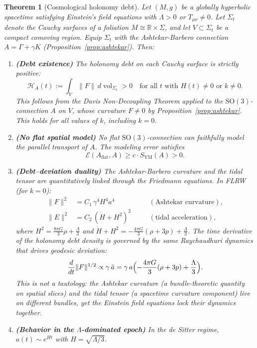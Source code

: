 \documentclass[12pt]{amsart}
\newtheorem{theorem}{Theorem}[section]
\theoremstyle{definition}
\newcommand{\R}{\mathbb{R}}
\newcommand{\vol}{\operatorname{vol}}
\newcommand{\SYM}{S_{\mathrm{YM}}}
\begin{document}
\begin{theorem}[Cosmological holonomy debt]
\label{thm:cosmo}
Let $(M, g)$ be a globally hyperbolic spacetime satisfying Einstein's field equations with $\Lambda > 0$ or $T_{\mu\nu} \neq 0$.  Let $\Sigma_t$ denote the Cauchy surfaces of a foliation $M \cong \R \times \Sigma$, and let $V \subset \Sigma_t$ be a compact comoving region.  Equip $\Sigma_t$ with the Ashtekar-Barbero connection $A = \Gamma + \gamma K$ (Proposition~\ref{prop:ashtekar}).  Then:
\begin{enumerate}[label=\textup{(\Roman*)}]
\item \textbf{(Debt existence)} The holonomy debt on each Cauchy surface is strictly positive:
\[
\mathcal{H}_A(t) := \int_V \|F\| \, d\vol_{\Sigma_t} > 0 \quad \text{for all } t \text{ with } H(t) \neq 0 \text{ or } k \neq 0.
\]
This follows from the Davis Non-Decoupling Theorem applied to the $\mathrm{SO}(3)$-connection $A$ on $V$, whose curvature $F \neq 0$ by Proposition~\ref{prop:ashtekar}.  This holds for \emph{all} values of $k$, including $k = 0$.

\item \textbf{(No flat spatial model)} No flat $\mathrm{SO}(3)$-connection can faithfully model the parallel transport of $A$.  The modeling error satisfies
\[
\mathcal{E}(A_{\mathrm{flat}}, A) \geq c \cdot \SYM(A) > 0.
\]

\item \textbf{(Debt--deviation duality)} The Ashtekar-Barbero curvature and the tidal tensor are quantitatively linked through the Friedmann equations.  In FLRW (for $k = 0$):
\begin{align*}
\|F\|^2 &= C_1\,\gamma^4 H^4 a^4 &\quad &(\text{Ashtekar curvature}), \\
\|E\|^2 &= C_2\,(\dot H + H^2)^2 &\quad &(\text{tidal acceleration}),
\end{align*}
where $H^2 = \frac{8\pi G}{3}\rho + \frac{\Lambda}{3}$ and $\dot H + H^2 = -\frac{4\pi G}{3}(\rho + 3p) + \frac{\Lambda}{3}$.  The time derivative of the holonomy debt density is governed by the same Raychaudhuri dynamics that drives geodesic deviation:
\[
\frac{d}{dt}\|F\|^{1/2} \propto \gamma\,\ddot a = \gamma\, a\Bigl(-\frac{4\pi G}{3}(\rho + 3p) + \frac{\Lambda}{3}\Bigr).
\]
This is not a tautology: the Ashtekar curvature (a bundle-theoretic quantity on spatial slices) and the tidal tensor (a spacetime curvature component) live on different bundles, yet the Einstein field equations lock their dynamics together.

\item \textbf{(Behavior in the $\Lambda$-dominated epoch)} In the de Sitter regime, $a(t) \sim e^{Ht}$ with $H = \sqrt{\Lambda/3}$.


\end{enumerate}
\end{theorem}
\end{document}
